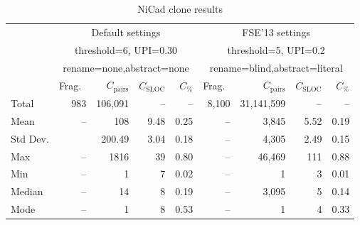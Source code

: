 \documentclass{IEEEtran}
\begin{document}
\begin{table}[h]
	\centering
	\caption{NiCad clone results}
	\label{t_nicad_raw_results}
		\begin{tabular}{l|r|r|r|r|r|r|r|r}
			\hline
			\multirow{4}{*}{} & \multicolumn{4}{c|}{Default settings} & \multicolumn{4}{c}{FSE'13 settings} \\ \cline{2-9} 
			& \multicolumn{4}{c|}{threshold=6, UPI=0.30} & \multicolumn{4}{c}{threshold=5, UPI=0.2} \\ %
			& \multicolumn{4}{c|}{rename=none,abstract=none} & \multicolumn{4}{c}{rename=blind,abstract=literal} \\ \cline{2-9} %
			& Frag.~ & $C_{\mathrm{pairs}}$ & $C_{\mathrm{SLOC}}$ & $C_{\mathrm{\%}}$ & Frag.~ & $C_{\mathrm{pairs}}$ & $C_{\mathrm{SLOC}}$ & $C_{\mathrm{\%}}$ \\ %
			\hline
			Total & 983 & 106,091 & -- & -- & 8,100 & 31,141,599 & -- & --    \\
			Mean & -- & 108 & 9.48 & 0.25 & -- & 3,845 & 5.52 & 0.19 \\
			Std Dev. & 	& 200.49 & 3.04	& 0.18 & -- & 4,305 & 2.49 & 0.15 \\
			Max & -- & 1816 & 39 & 0.80 & -- & 46,469 & 111 & 0.88 \\
			Min & -- & 1 & 7 & 0.02 & -- & 1 & 3	 & 0.01 \\
			Median & -- & 14 & 8 & 0.19 & -- & 3,095 & 5 & 0.14 \\
			Mode & -- & 1 & 8 & 0.53 & -- & 1 & 4 & 0.33 \\
			\hline
		\end{tabular} 
\end{table}

\end{document}
